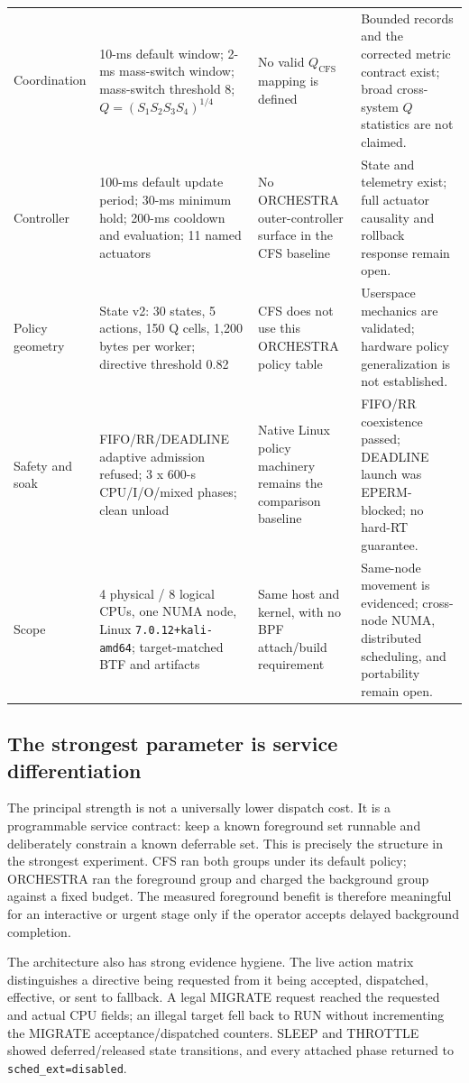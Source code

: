 \documentclass[10pt,letterpaper,twocolumn]{article}
\begin{document}
\begin{table}[t]
\begin{tabularx}{\textwidth}{p{}p{}p{}Y}
Coordination & 10-ms default window; 2-ms mass-switch window; mass-switch threshold 8; $Q=(S_1S_2S_3S_4)^{1/4}$ & No valid $Q_{\mathrm{CFS}}$ mapping is defined & Bounded records and the corrected metric contract exist; broad cross-system $Q$ statistics are not claimed. \\
Controller & 100-ms default update period; 30-ms minimum hold; 200-ms cooldown and evaluation; 11 named actuators & No ORCHESTRA outer-controller surface in the CFS baseline & State and telemetry exist; full actuator causality and rollback response remain open. \\
Policy geometry & State v2: 30 states, 5 actions, 150 Q cells, 1,200 bytes per worker; directive threshold 0.82 & CFS does not use this ORCHESTRA policy table & Userspace mechanics are validated; hardware policy generalization is not established. \\
Safety and soak & FIFO/RR/DEADLINE adaptive admission refused; 3 x 600-s CPU/I/O/mixed phases; clean unload & Native Linux policy machinery remains the comparison baseline & FIFO/RR coexistence passed; DEADLINE launch was EPERM-blocked; no hard-RT guarantee. \\
Scope & 4 physical / 8 logical CPUs, one NUMA node, Linux \texttt{7.0.12+kali-amd64}; target-matched BTF and artifacts & Same host and kernel, with no BPF attach/build requirement & Same-node movement is evidenced; cross-node NUMA, distributed scheduling, and portability remain open. \\
\bottomrule
\end{tabularx}
\end{table}

\subsection{The strongest parameter is service differentiation}

The principal strength is not a universally lower dispatch cost. It is a programmable service contract: keep a known foreground set runnable and deliberately constrain a known deferrable set. This is precisely the structure in the strongest experiment. CFS ran both groups under its default policy; ORCHESTRA ran the foreground group and charged the background group against a fixed budget. The measured foreground benefit is therefore meaningful for an interactive or urgent stage only if the operator accepts delayed background completion.

The architecture also has strong evidence hygiene. The live action matrix distinguishes a directive being requested from it being accepted, dispatched, effective, or sent to fallback. A legal MIGRATE request reached the requested and actual CPU fields; an illegal target fell back to RUN without incrementing the MIGRATE acceptance/dispatched counters. SLEEP and THROTTLE showed deferred/released state transitions, and every attached phase returned to \texttt{sched\_ext=disabled}.
\end{document}
